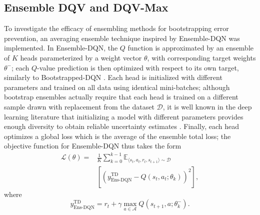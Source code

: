 \subsection{Ensemble DQV and DQV-Max}
To investigate the efficacy of ensembling methods for
bootstrapping error prevention, an averaging ensemble
technique inspired by Ensemble-DQN \citep{agarwal2020optimistic} was
implemented.
In Ensemble-DQN, the $Q$ function is approximated by
an ensemble of $K$ heads parameterized by a weight vector $\theta$,
with corresponding target weights $\theta^-$; each $Q$-value
prediction
is then optimized with respect to its own target,
similarly to Bootstrapped-DQN \citep{osband2016deep}. Each head is
initialized with different parameters and trained on all data using
identical mini-batches; although bootstrap ensembles actually require
that each head is trained on a different sample drawn with
replacement from the dataset $\mathcal{D}$, it is well known in the
deep learning literature that
initializing a model with different parameters provides enough
diversity to obtain reliable uncertainty estimates
\citep{osband2016deep,levine2020offline}. Finally, each head optimizes
a global loss which is the average of the ensemble total loss; the
objective function for Ensemble-DQN thus takes the form
\begin{equation}
  \begin{aligned}
\mathcal{L}\left(\theta\right)=&\frac{1}{K}\sum_{k=0}^{k-1}\mathbb{E}_{\langle
                                 s_t,a_t,r_t,s_{t+1}\rangle\sim\mathcal{D}}\\
                               &\left[{\left(y^{\scriptscriptstyle\textrm{TD}}_{\scriptscriptstyle\textrm{Ens-DQN}}-Q\left(s_t,a_t;\theta_{k}\right)\right)}^2\right],
  \end{aligned}
\end{equation}
where
\begin{equation}
  y^{\scriptscriptstyle\textrm{TD}}_{\scriptscriptstyle\textrm{Ens-DQN}}=r_t+\gamma\max_{a\in\mathcal{A}}Q\left(s_{t+1},a;\theta_{k}^{-}\right).
\end{equation}

